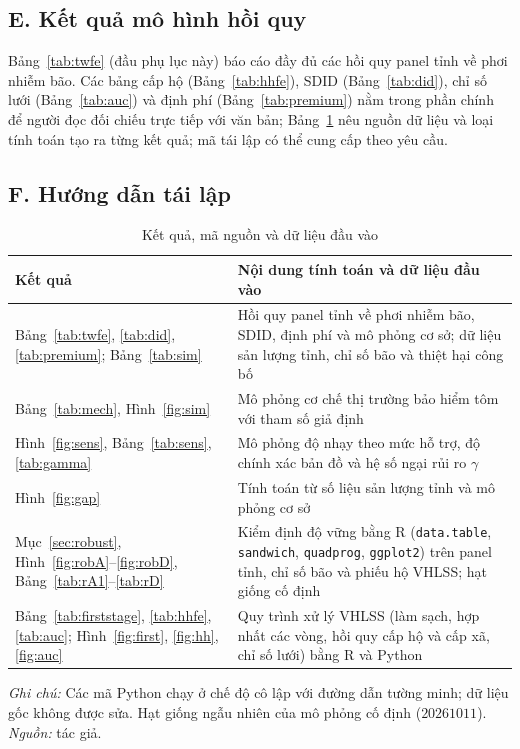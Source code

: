 \documentclass[12pt,a4paper]{article}
\begin{document}
\subsection*{E. Kết quả mô hình hồi quy}

Bảng~\ref{tab:twfe} (đầu phụ lục này) báo cáo đầy đủ các hồi quy panel tỉnh về phơi nhiễm bão. Các bảng cấp hộ (Bảng~\ref{tab:hhfe}), SDID (Bảng~\ref{tab:did}), chỉ số lưới (Bảng~\ref{tab:auc}) và định phí (Bảng~\ref{tab:premium}) nằm trong phần chính để người đọc đối chiếu trực tiếp với văn bản; Bảng~\ref{tab:repl} nêu nguồn dữ liệu và loại tính toán tạo ra từng kết quả; mã tái lập có thể cung cấp theo yêu cầu.

\subsection*{F. Hướng dẫn tái lập}

\begin{table}[!tbp]
\centering\footnotesize
\caption{Kết quả, mã nguồn và dữ liệu đầu vào}
\label{tab:repl}
\begin{tabularx}{\textwidth}{@{}>{\raggedright\arraybackslash}p{4.2cm}>{\raggedright\arraybackslash}X@{}}
\toprule
Kết quả & Nội dung tính toán và dữ liệu đầu vào \\
\midrule
Bảng~\ref{tab:twfe}, \ref{tab:did}, \ref{tab:premium}; Bảng~\ref{tab:sim} & Hồi quy panel tỉnh về phơi nhiễm bão, SDID, định phí và mô phỏng cơ sở; dữ liệu sản lượng tỉnh, chỉ số bão và thiệt hại công bố \\
Bảng~\ref{tab:mech}, Hình~\ref{fig:sim} & Mô phỏng cơ chế thị trường bảo hiểm tôm với tham số giả định \\
Hình~\ref{fig:sens}, Bảng~\ref{tab:sens}, \ref{tab:gamma} & Mô phỏng độ nhạy theo mức hỗ trợ, độ chính xác bản đồ và hệ số ngại rủi ro $\gamma$ \\
Hình~\ref{fig:gap} & Tính toán từ số liệu sản lượng tỉnh và mô phỏng cơ sở \\
Mục~\ref{sec:robust}, Hình~\ref{fig:robA}--\ref{fig:robD}, Bảng~\ref{tab:rA1}--\ref{tab:rD} & Kiểm định độ vững bằng R (\texttt{data.table}, \texttt{sandwich}, \texttt{quadprog}, \texttt{ggplot2}) trên panel tỉnh, chỉ số bão và phiếu hộ VHLSS; hạt giống cố định \\
Bảng~\ref{tab:firststage}, \ref{tab:hhfe}, \ref{tab:auc}; Hình~\ref{fig:first}, \ref{fig:hh}, \ref{fig:auc} & Quy trình xử lý VHLSS (làm sạch, hợp nhất các vòng, hồi quy cấp hộ và cấp xã, chỉ số lưới) bằng R và Python \\
\bottomrule
\end{tabularx}
\begin{minipage}{\textwidth}\footnotesize
\textit{Ghi chú:} Các mã Python chạy ở chế độ cô lập với đường dẫn tường minh; dữ liệu gốc không được sửa. Hạt giống ngẫu nhiên của mô phỏng cố định ($20261011$). \textit{Nguồn:} tác giả.
\end{minipage}
\end{table}
\end{document}
